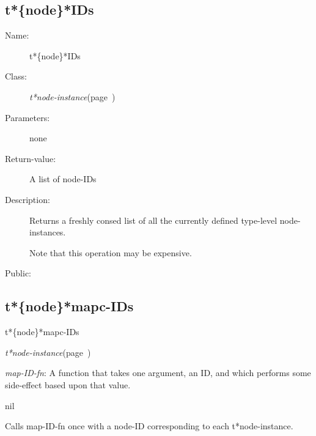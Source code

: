 \subsection{t*\{node\}*IDs}
\label{t*node*IDs}

\begin{description}
\item [Name:]  t*\{node\}*IDs

\item [Class:] {\sl t*node-instance}\hfill(page~\pageref{t*node-instance})

\item [Parameters:] none

\item [Return-value:] A list of node-IDs

\item [Description:]

Returns a freshly consed list of all the currently
defined type-level node-instances.  

Note that this operation may be expensive. 

\item [Public:]



\end{description}
\horizontalline

\subsection{t*\{node\}*mapc-IDs}
\label{t*node*mapc-IDs}

\begin{description}
\item [Name:]  t*\{node\}*mapc-IDs

\item [Class:] {\sl t*node-instance}\hfill(page~\pageref{t*node-instance})

\item [Parameters:]
\item {\sl map-ID-fn}:  A function that takes one argument, an ID,
and which performs some side-effect based upon that
value.



\item [Return-value:] nil

\item [Description:]

Calls map-ID-fn once with a node-ID corresponding
to each t*node-instance. 

\item [Public:]



\end{description}
\horizontalline

